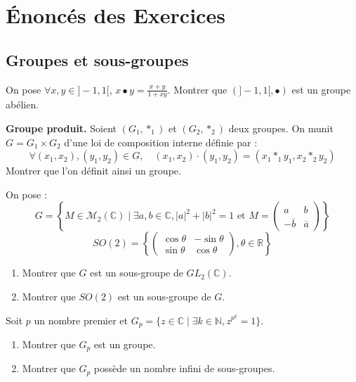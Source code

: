 \section{Énoncés des Exercices}

\subsection{Groupes et sous-groupes}

\begin{exercice}
On pose $\forall x,y\in]-1,1[$, $x\bullet y=\frac{x+y}{1+xy}$.
Montrer que $(]-1,1[, \bullet)$ est un groupe abélien.
\end{exercice}

\begin{exercice}
\textbf{Groupe produit.}
Soient $(G_{1},*_{1})$ et $(G_{2},*_{2})$ deux groupes.
On munit $G=G_{1}\times G_{2}$ d'une loi de composition interne définie par :
$$ \forall(x_{1},x_{2}), (y_{1}, y_{2}) \in G, \quad (x_{1}, x_{2}) \cdot (y_{1}, y_{2}) = (x_{1} *_{1} y_{1}, x_{2} *_{2} y_{2}) $$
Montrer que l'on définit ainsi un groupe.
\end{exercice}

\begin{exercice}
On pose :
$$ G=\left\{M\in \mathcal{M}_{2}(\mathbb{C}) \mid \exists a,b\in\mathbb{C}, |a|^{2}+|b|^{2}=1 \text{ et } M=\begin{pmatrix}a&b\\ -\overline{b}&\overline{a}\end{pmatrix}\right\} $$
$$ SO(2)=\left\{\begin{pmatrix}\cos\theta&-\sin\theta\\ \sin\theta&\cos\theta\end{pmatrix}, \theta\in\mathbb{R}\right\} $$
\begin{enumerate}
    \item Montrer que $G$ est un sous-groupe de $GL_{2}(\mathbb{C})$.
    \item Montrer que $SO(2)$ est un sous-groupe de $G$.
\end{enumerate}
\end{exercice}

\begin{exercice}
Soit $p$ un nombre premier et $G_{p}=\{z\in\mathbb{C} \mid \exists k\in\mathbb{N}, z^{p^{k}}=1\}$.
\begin{enumerate}
    \item Montrer que $G_{p}$ est un groupe.
    \item Montrer que $G_{p}$ possède un nombre infini de sous-groupes.
\end{enumerate}
\end{exercice}

